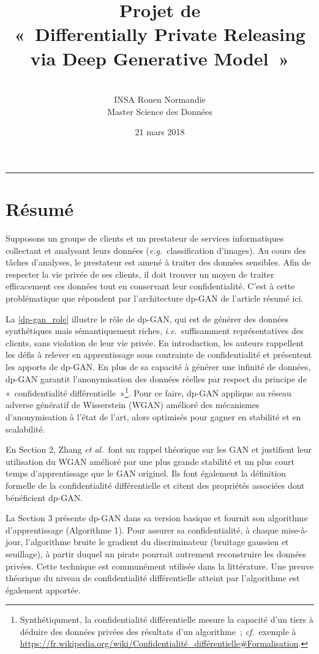 \documentclass[a4paper,11pt,twocolumn,twoside]{article}
\title{\textbf{Projet de \DL}\\« Differentially Private Releasing via Deep Generative Model »}
\author{\textbf{\AH}\\INSA Rouen Normandie\\Master Science des Données}
\date{21 mars 2018}
\theoremstyle{definition}
\newcommand{\eg}{\textit{e.g.}}
\newcommand{\ie}{\textit{i.e.}}
\newcommand{\etal}{\textit{et al.}}
\newcommand{\cf}{\textit{cf.}}
\begin{document}
\maketitle
\thispagestyle{empty}
\hrule height 0.8pt

\section{Résumé}
Supposons un groupe de clients et un prestateur de services informatiques collectant et analysant leurs données (\eg\ classification d'images). Au cours des tâches d'analyses, le prestateur est amené à traiter des données sensibles. Afin de respecter la vie privée de ses clients, il doit trouver un moyen de traiter efficacement ces données tout en conservant leur confidentialité. C'est à cette problématique que répondent \citet{dpgan} par l'architecture dp-GAN de l'article résumé ici.

La \autoref{dp-gan_role} illustre le rôle de dp-GAN, qui est de générer des données synthétiques mais sémantiquement riches, \ie\ suffisamment représentatives des clients, sans violation de leur vie privée.
En introduction, les auteurs rappellent les défis à relever en apprentissage sous contrainte de confidentialité et présentent les apports de dp-GAN. En plus de sa capacité à générer une infinité de données, dp-GAN garantit l'anonymisation des données réelles par respect du principe de « confidentialité différentielle »\footnote{Synthétiqument, la confidentialité différentielle mesure la capacité d'un tiers à déduire des données privées des résultats d'un algorithme ; \cf\ exemple à \url{https://fr.wikipedia.org/wiki/Confidentialité_différentielle#Formalisation}.}.
Pour ce faire, dp-GAN applique au réseau adverse génératif de Wisserstein (WGAN) amélioré des mécanismes d'anonymisation à l'état de l'art, alors optimisés pour gagner en stabilité et en scalabilité.

En Section 2, Zhang \etal\ font un rappel théorique sur les GAN et justifient leur utilisation du WGAN amélioré par une plus grande stabilité et un plus court temps d'apprentissage que le GAN originel. Ils font également la définition formelle de la confidentialité différentielle et citent des propriétés associées dont bénéficient dp-GAN.

La Section 3 présente dp-GAN dans sa version basique et fournit son algorithme d'apprentissage (Algorithme 1). Pour assurer sa confidentialité, à chaque mise-à-jour, l'algorithme bruite le gradient du discriminateur (bruitage gaussien et seuillage), à partir duquel un pirate pourrait autrement reconstruire les données privées. Cette technique est communément utilisée dans la littérature. Une preuve théorique du niveau de confidentialité différentielle atteint par l'algorithme est également apportée.
\end{document}
